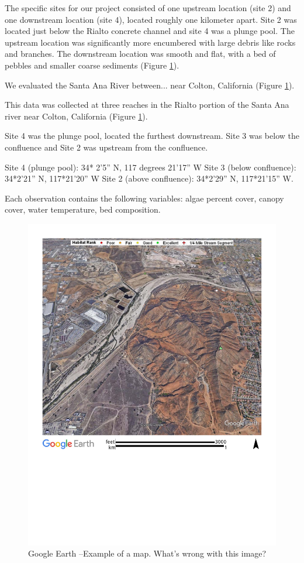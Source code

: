 \documentclass{article}\usepackage[]{graphicx}\usepackage[]{color}
\begin{document}
The specific sites for our project consisted of one upstream location (site 2) and one downstream location (site 4), located roughly one kilometer apart. Site 2 was located just below the Rialto concrete channel and site 4 was a plunge pool. The upstream location was significantly more encumbered with large debris like rocks and branches. The downstream location was smooth and flat, with a bed of pebbles and smaller coarse sediments (Figure \ref{SAR_Image}). 

We evaluated the Santa Ana River between... near Colton, California (Figure \ref{SAR_Image}). 

This data was collected at three reaches in the Rialto portion of the Santa Ana river near Colton, California (Figure \ref{SAR_Image}).

Site 4 was the plunge pool, located the furthest downstream. Site 3 was below the confluence and Site 2 was upstream from the confluence. 


Site 4 (plunge pool): 34* 2’5” N, 117 degrees 21’17” W 
Site 3 (below conﬂuence): 34*2’21” N, 117*21’20” W 
Site 2 (above conﬂuence): 34*2’29” N, 117*21’15” W. 

Each observation contains the following variables: algae percent cover, canopy cover, water temperature, bed composition.  


\begin{figure}
\includegraphics[width=1.00\textwidth]{Figures/SantaAna_SatelliteImage}
\caption{Google Earth --Example of a map. What's wrong with this image?}
\label{SAR_Image}
\end{figure}
\end{document}

